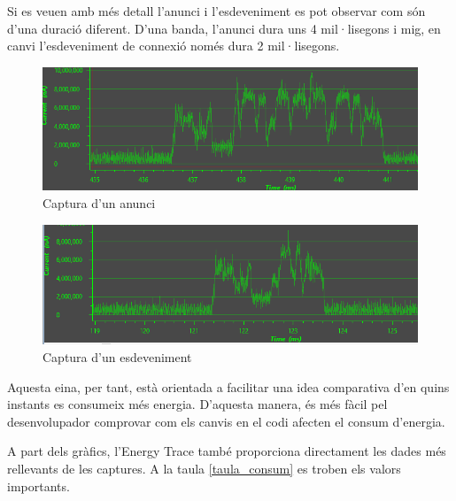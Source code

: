 Si es veuen amb més detall l'anunci i l'esdeveniment es pot observar com són d'una duració diferent.
D'una banda, l'anunci dura uns 4 mil·lisegons i mig, en canvi l'esdeveniment de connexió només dura 2 mil·lisegons.
\newline
\begin{figure}[!h]
	\begin{center}
		\includegraphics[width=\textwidth]{./images/pic_anunci_captura.png}
		\caption{Captura d'un anunci}
		\label{energy_trace_adv}
	\end{center}
\end{figure}
\begin{figure}[!h]
	\begin{center}
		\includegraphics[width=\textwidth]{./images/pic_connectat_captura.png}
		\caption{Captura d'un esdeveniment}
		\label{energy_trace_event}
	\end{center}
\end{figure}

Aquesta eina, per tant, està orientada a facilitar una idea comparativa d'en quins instants es consumeix més energia.
D'aquesta manera, és més fàcil pel desenvolupador comprovar com els canvis en el codi afecten el consum d'energia.

A part dels gràfics, l'Energy Trace també proporciona directament les dades més rellevants de les captures.
A la taula \ref{taula_consum} es troben els valors importants.\newline

